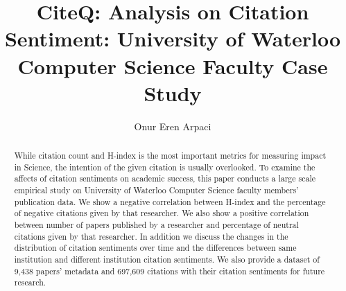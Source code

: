 \documentclass[sigconf]{acmart}
\begin{document}
\title{CiteQ: Analysis on Citation Sentiment: University of Waterloo Computer Science Faculty Case Study} 

\author{Onur Eren Arpaci}

\renewcommand{\shortauthors}{Arpaci}

\begin{abstract}
While citation count and H-index is the most important metrics for measuring impact in Science, the intention of the given citation is usually overlooked. To examine the affects of citation sentiments on academic success, this paper conducts a large scale empirical study on University of Waterloo Computer Science faculty members' publication data. We show a negative correlation between H-index and the percentage of negative citations given by that researcher. We also show a positive correlation between number of papers published by a researcher and percentage of neutral citations given by that researcher. In addition we discuss the changes in the distribution of citation sentiments over time and the differences between same institution and different institution citation sentiments. We also provide a dataset of 9,438 papers' metadata and 697,609 citations with their citation sentiments for future research.
\end{abstract}
\end{document}
